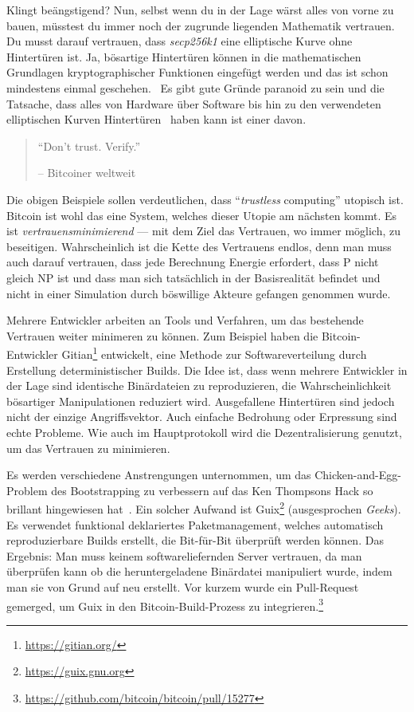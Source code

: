 Klingt beängstigend? Nun, selbst wenn du in der Lage wärst alles von vorne zu
bauen, müsstest du immer noch der zugrunde liegenden Mathematik vertrauen. Du
musst darauf vertrauen, dass \textit{secp256k1} eine elliptische Kurve ohne
Hintertüren ist. Ja, bösartige Hintertüren können in die mathematischen
Grundlagen kryptographischer Funktionen eingefügt werden und das ist schon
mindestens einmal geschehen.~\cite{wiki:Dual_EC_DRBG} Es gibt gute Gründe
paranoid zu sein und die Tatsache, dass alles von Hardware über Software bis hin
zu den verwendeten elliptischen Kurven Hintertüren~\cite{wiki:backdoors} haben
kann ist einer davon.

\begin{quotation}\begin{samepage}
\enquote{Don't trust. Verify.}
\begin{flushright} -- Bitcoiner weltweit
\end{flushright}\end{samepage}\end{quotation}

Die obigen Beispiele sollen verdeutlichen, dass \enquote{\textit{trustless}
computing} utopisch ist. Bitcoin ist wohl das eine System, welches dieser Utopie
am nächsten kommt. Es ist \textit{vertrauensminimierend} — mit dem Ziel das
Vertrauen, wo immer möglich, zu beseitigen. Wahrscheinlich ist die Kette des
Vertrauens endlos, denn man muss auch darauf vertrauen, dass jede Berechnung
Energie erfordert, dass P nicht gleich NP ist und dass man sich tatsächlich in
der Basisrealität befindet und nicht in einer Simulation durch böswillige
Akteure gefangen genommen wurde.

Mehrere Entwickler arbeiten an Tools und Verfahren, um das bestehende Vertrauen
weiter minimeren zu können. Zum Beispiel haben die Bitcoin-Entwickler
Gitian\footnote{\url{https://gitian.org/}} entwickelt, eine Methode zur
Softwareverteilung durch Erstellung deterministischer Builds. Die Idee ist, dass
wenn mehrere Entwickler in der Lage sind identische Binärdateien zu
reproduzieren, die Wahrscheinlichkeit bösartiger Manipulationen reduziert wird.
Ausgefallene Hintertüren sind jedoch nicht der einzige Angriffsvektor. Auch
einfache Bedrohung oder Erpressung sind echte Probleme. Wie auch im
Hauptprotokoll wird die Dezentralisierung genutzt, um das Vertrauen zu
minimieren.

Es werden verschiedene Anstrengungen unternommen, um das Chicken-and-Egg-Problem
des Bootstrapping zu verbessern auf das Ken Thompsons Hack so brillant
hingewiesen hat~\cite{web:bootstrapping}. Ein solcher Aufwand ist
Guix\footnote{\url{https://guix.gnu.org}} (ausgesprochen \textit{Geeks}). Es
verwendet funktional deklariertes Paketmanagement, welches automatisch
reproduzierbare Builds erstellt, die Bit-für-Bit überprüft werden können. Das
Ergebnis: Man muss keinem softwareliefernden Server vertrauen, da man überprüfen
kann ob die heruntergeladene Binärdatei manipuliert wurde, indem man sie von
Grund auf neu erstellt. Vor kurzem wurde ein Pull-Request gemerged, um Guix in
den Bitcoin-Build-Prozess zu
integrieren.\footnote{\url{https://github.com/bitcoin/bitcoin/pull/15277}}


